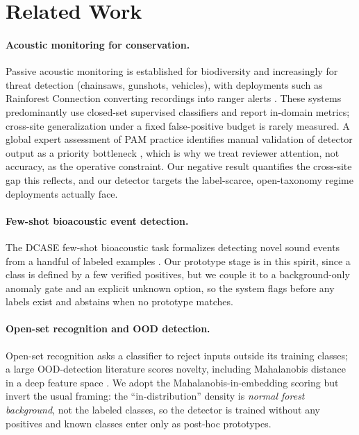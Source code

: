 \section{Related Work}
\label{sec:related}

\paragraph{Acoustic monitoring for conservation.} Passive acoustic monitoring is
established for biodiversity and increasingly for threat detection (chainsaws,
gunshots, vehicles), with deployments such as Rainforest Connection converting
recordings into ranger alerts \citep{stowell2022bioacoustics}. These systems
predominantly use closed-set supervised classifiers and report in-domain metrics; cross-site generalization
under a fixed false-positive budget is rarely measured. A global expert assessment of
PAM practice identifies manual validation of detector output as a priority
bottleneck \citep{malerba2026pam}, which is why we treat reviewer attention,
not accuracy, as the operative constraint. Our negative
result quantifies the cross-site gap this reflects, and our detector targets the
label-scarce, open-taxonomy regime deployments actually face.


\paragraph{Few-shot bioacoustic event detection.} The DCASE few-shot bioacoustic
task formalizes detecting novel sound events from a handful of labeled examples
\citep{nolasco2023dcase}. Our prototype stage is in this spirit, since a class is defined by a few
verified positives, but we couple it to a background-only anomaly gate and an
explicit unknown option, so the system flags before any labels exist and
abstains when no prototype matches.


\paragraph{Open-set recognition and OOD detection.} Open-set recognition asks a
classifier to reject inputs outside its training classes; a large OOD-detection
literature scores novelty, including Mahalanobis distance in a deep feature
space \citep{lee2018mahalanobis}. We adopt the Mahalanobis-in-embedding scoring but invert the usual
framing: the ``in-distribution'' density is \emph{normal forest background}, not
the labeled classes, so the detector is trained without any positives and known
classes enter only as post-hoc prototypes.



